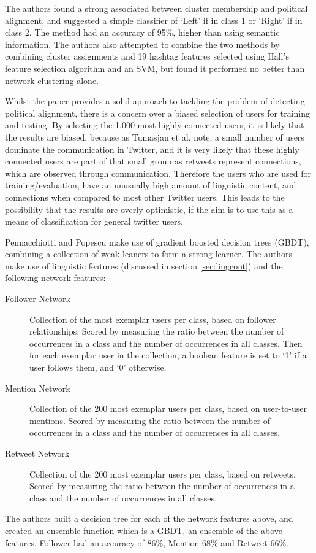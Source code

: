 \documentclass[bsc,frontabs,singlespacing,parskip]{infthesis}     %
\begin{document}
The authors found a strong associated between cluster membership and political alignment, and suggested a simple classifier of `Left' if in class 1 or `Right' if in class 2. The method had an accuracy of 95\%, higher than using semantic information. The authors also attempted to combine the two methods by combining cluster assignments and 19 hashtag features selected using Hall's feature selection algorithm and an SVM, but found it performed no better than network clustering alone. 

Whilst the paper provides a solid approach to tackling the problem of detecting political alignment, there is a concern over a biased selection of users for training and testing. By selecting the 1,000 most highly connected users, it is likely that the results are biased, because as Tumasjan et al. \cite{predelections} note, a small number of users dominate the communication in Twitter, and it is very likely that these highly connected users are part of that small group as retweets represent connections, which are observed through communication. Therefore the users who are used for training/evaluation, have an unusually high amount of linguistic content, and connections when compared to most other Twitter users. This leads to the possibility that the results are overly optimistic, if the aim is to use this as a means of classification for general twitter users. 

Pennacchiotti and Popescu \cite{yahoopaper} make use of gradient boosted decision trees (GBDT), combining a collection of weak leaners to form a strong learner. The authors make use of linguistic features (discussed in section \ref{sec:lingcont}) and the following network features:

\begin{description}
\item[Follower Network] Collection of the most exemplar users per class, based on follower relationships. Scored by measuring the ratio between the number of occurrences in a class and the number of occurrences in all classes. Then for each exemplar user in the collection, a boolean feature is set to `1' if a user follows them, and `0' otherwise.

\item[Mention Network] Collection of the 200 most exemplar users per class, based on user-to-user mentions. Scored by measuring the ratio between the number of occurrences in a class and the number of occurrences in all classes. 
\item[Retweet Network] Collection of the 200 most exemplar users per class, based on retweets. Scored by measuring the ratio between the number of occurrences in a class and the number of occurrences in all classes. 
\end{description}
The authors built a decision tree for each of the network features above, and created an ensemble function which is a GBDT, an ensemble of the above features. Follower had an accuracy of 86\%, Mention 68\% and Retweet 66\%.
\end{document}
